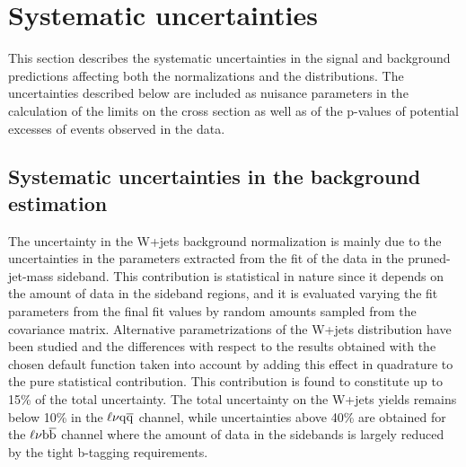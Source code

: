 \section{Systematic uncertainties}\label{sec:systUnc}

This section describes the systematic uncertainties in the signal and background predictions affecting both the normalizations and the \mlvj distributions.
The uncertainties described below are included as nuisance parameters in the calculation of the limits on the cross section as well as of the p-values of potential excesses of events
observed in the data. %

\subsection{Systematic uncertainties in the background estimation}\label{subsec:uncBkg}

The uncertainty in the W+jets background normalization is mainly due to the uncertainties in the parameters extracted from the fit of the data in the pruned-jet-mass sideband. This contribution is statistical in nature since it depends on the amount of data in the \mJ sideband regions, and it is evaluated varying the fit parameters from the final fit values by random amounts sampled from the covariance matrix.
Alternative parametrizations of the W+jets \mJ distribution have been studied and the differences with respect to the results obtained with the chosen default function taken into account by adding this effect in quadrature to the pure statistical contribution.
This contribution is found to constitute up to 15\% of the total uncertainty. The total uncertainty on the W+jets yields remains below 10\% in the $\ell\nu\mathrm{q}\overline{\mathrm{q}}$ channel, while uncertainties above 40\% are obtained for the $\ell\nu{\mathrm{b}\overline{\mathrm{b}}}$ channel where the amount of data in the sidebands is largely reduced by the tight b-tagging requirements.

